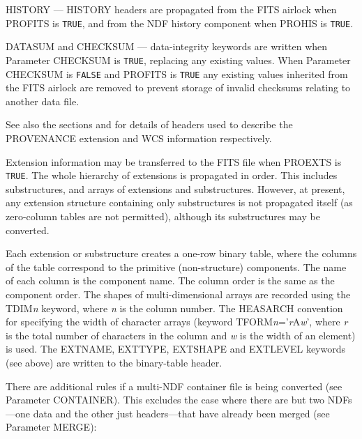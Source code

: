 \documentclass[twoside,11pt]{starlink}
\begin{document}
{{{{            \sstitem
            HISTORY --- HISTORY headers are propagated from the FITS
              airlock when PROFITS is \texttt{TRUE}, and from the NDF
              history component when PROHIS is \texttt{TRUE}.

            \sstitem
            DATASUM and CHECKSUM --- data-integrity keywords are written
            when Parameter CHECKSUM is \texttt{TRUE}, replacing any existing
            values.  When Parameter CHECKSUM is \texttt{FALSE} and PROFITS is
            \texttt{TRUE} any existing values inherited from the FITS airlock are
            removed to prevent storage of invalid checksums relating to
            another data file.

         }
         See also the sections
          and
         for details of headers used to describe the PROVENANCE extension
         and WCS information respectively.

         \sstitem
         Extension information may be transferred to the FITS file when
         PROEXTS is \texttt{TRUE}.
         The whole hierarchy of extensions is propagated
         in order.  This includes substructures, and arrays of extensions
         and substructures.  However, at present, any extension structure
         containing only substructures is not propagated itself (as
         zero-column tables are not permitted), although its
         substructures may be converted.

         Each extension or substructure creates a one-row binary table,
         where the columns of the table correspond to the primitive
         (non-structure) components.  The name of each column is the
         component name.  The column order is the same as the component
         order.  The shapes of multi-dimensional arrays are recorded using
         the TDIM\textit{n} keyword, where \textit{n} is the column number.
         The HEASARCH convention for specifying the width of character arrays
         (keyword TFORM\textit{n}='\textit{r}A\textit{w}', where \textit{r} is
         the total number of characters in the column and \textit{w} is the
         width of an element) is used.  The EXTNAME,
         EXTTYPE, EXTSHAPE and EXTLEVEL keywords (see above) are written
         to the binary-table header.

      }
      There are additional rules if a multi-NDF container file is being
      converted (see Parameter CONTAINER).  This excludes the case where
      there are but two NDFs---one data and the other just
      headers---that have already been merged (see Parameter MERGE):
      \ssthitemlist{

}}}
\end{document}
